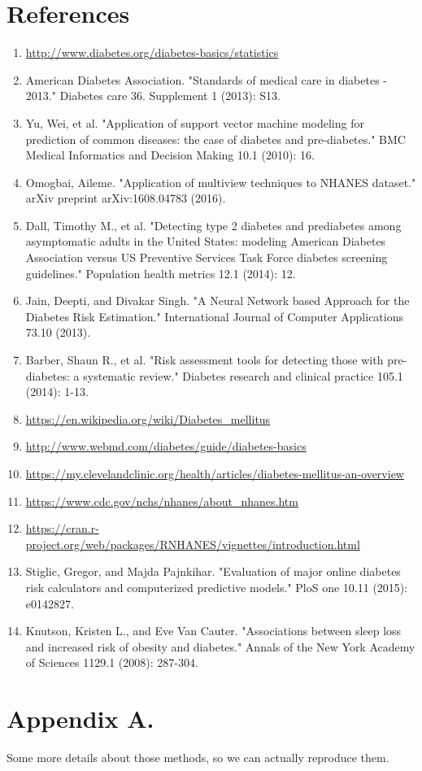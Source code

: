 \documentclass[twoside,11pt]{article}
\begin{document}
\section{References}
\begin{enumerate}
\item \url{http://www.diabetes.org/diabetes-basics/statistics}
\item American Diabetes Association. "Standards of medical care in diabetes - 2013." Diabetes care 36. Supplement 1 (2013): S13.
\item Yu, Wei, et al. "Application of support vector machine modeling for prediction of common diseases: the case of diabetes and pre-diabetes." BMC Medical Informatics and Decision Making 10.1 (2010): 16.
\item Omogbai, Aileme. "Application of multiview techniques to NHANES dataset." arXiv preprint arXiv:1608.04783 (2016).
\item Dall, Timothy M., et al. "Detecting type 2 diabetes and prediabetes among asymptomatic adults in the United States: modeling American Diabetes Association versus US Preventive Services Task Force diabetes screening guidelines." Population health metrics 12.1 (2014): 12.
\item Jain, Deepti, and Divakar Singh. "A Neural Network based Approach for the Diabetes Risk Estimation." International Journal of Computer Applications 73.10 (2013).
\item Barber, Shaun R., et al. "Risk assessment tools for detecting those with pre-diabetes: a systematic review." Diabetes research and clinical practice 105.1 (2014): 1-13.
\item \url{https://en.wikipedia.org/wiki/Diabetes_mellitus}
\item \url{http://www.webmd.com/diabetes/guide/diabetes-basics}
\item \url{https://my.clevelandclinic.org/health/articles/diabetes-mellitus-an-overview}
\item \url{https://www.cdc.gov/nchs/nhanes/about_nhanes.htm}
\item \url{https://cran.r-project.org/web/packages/RNHANES/vignettes/introduction.html}
\item Stiglic, Gregor, and Majda Pajnkihar. "Evaluation of major online diabetes risk calculators and computerized predictive models." PloS one 10.11 (2015): e0142827.
\item Knutson, Kristen L., and Eve Van Cauter. "Associations between sleep loss and increased risk of obesity and diabetes." Annals of the New York Academy of Sciences 1129.1 (2008): 287-304.
\end{enumerate}


\appendix
\section*{Appendix A.}
Some more details about those methods, so we can actually reproduce them.
\end{document}
